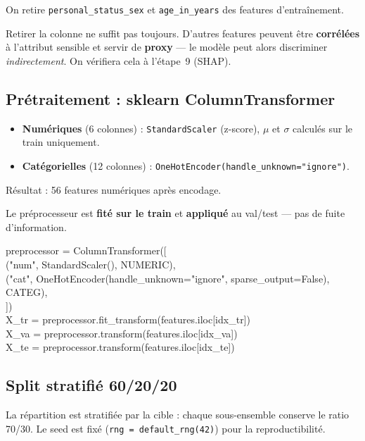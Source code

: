 \documentclass[11pt, a4paper]{article}
\begin{document}
On retire \texttt{personal\_status\_sex} et \texttt{age\_in\_years} des features d'entra\^{i}nement.

\begin{attentionbox}
Retirer la colonne ne suffit pas toujours. D'autres features peuvent \^{e}tre \textbf{corr\'{e}l\'{e}es} \`{a} l'attribut sensible et servir de \textbf{proxy} --- le mod\`{e}le peut alors discriminer \emph{indirectement}. On v\'{e}rifiera cela \`{a} l'\'{e}tape~9 (SHAP).
\end{attentionbox}

\subsection{Pr\'{e}traitement : sklearn ColumnTransformer}

\begin{itemize}
    \item \textbf{Num\'{e}riques} (6 colonnes) : \texttt{StandardScaler} (z-score), $\mu$ et $\sigma$ calcul\'{e}s sur le train uniquement.
    \item \textbf{Cat\'{e}gorielles} (12 colonnes) : \texttt{OneHotEncoder(handle\_unknown="ignore")}.
\end{itemize}

\noindent R\'{e}sultat : 56 features num\'{e}riques apr\`{e}s encodage.

Le pr\'{e}processeur est \textbf{fit\'{e} sur le train} et \textbf{appliqu\'{e}} au val/test --- pas de fuite d'information.

\begin{codebox}
preprocessor = ColumnTransformer([\\
\quad ("num", StandardScaler(), NUMERIC),\\
\quad ("cat", OneHotEncoder(handle\_unknown="ignore", sparse\_output=False), CATEG),\\
])\\
X\_tr = preprocessor.fit\_transform(features.iloc[idx\_tr])\\
X\_va = preprocessor.transform(features.iloc[idx\_va])\\
X\_te = preprocessor.transform(features.iloc[idx\_te])
\end{codebox}

\subsection{Split stratifi\'{e} 60/20/20}

La r\'{e}partition est stratifi\'{e}e par la cible : chaque sous-ensemble conserve le ratio 70/30. Le seed est fix\'{e} (\texttt{rng = default\_rng(42)}) pour la reproductibilit\'{e}.
\end{document}
